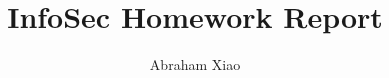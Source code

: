\documentclass{article}
\begin{document}
\title{InfoSec Homework Report}
\author{Abraham Xiao}
\maketitle
\end{document}
